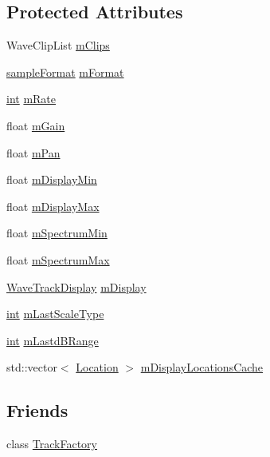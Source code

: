 \subsection*{Protected Attributes}
\begin{DoxyCompactItemize}
\item 
Wave\+Clip\+List \hyperlink{class_wave_track_aab186786a53179d53c986771c42f5880}{m\+Clips}
\item 
\hyperlink{include_2audacity_2_types_8h_a9938d2e2f6adef23e745cd80ef379792}{sample\+Format} \hyperlink{class_wave_track_a3938299d11824a2314ce22c688468e26}{m\+Format}
\item 
\hyperlink{xmltok_8h_a5a0d4a5641ce434f1d23533f2b2e6653}{int} \hyperlink{class_wave_track_ac9ff43cf5ca331f25aa7796beaa7c016}{m\+Rate}
\item 
float \hyperlink{class_wave_track_a07150ae1d89338c529717a3a43163bbc}{m\+Gain}
\item 
float \hyperlink{class_wave_track_a342936b12f0ed288970c87eaed874b71}{m\+Pan}
\item 
float \hyperlink{class_wave_track_a144805b8b5d766763d93cf1c47bb0cc0}{m\+Display\+Min}
\item 
float \hyperlink{class_wave_track_a8dbec05f10d02f2c2547d846ca8cfc21}{m\+Display\+Max}
\item 
float \hyperlink{class_wave_track_a69645755c41a02f3c20f80f0bf5ced79}{m\+Spectrum\+Min}
\item 
float \hyperlink{class_wave_track_a92d5b6594bbe1a2b7dba5121c52882c6}{m\+Spectrum\+Max}
\item 
\hyperlink{class_wave_track_a084eba52413a5cc74d2634b36e2f85b5}{Wave\+Track\+Display} \hyperlink{class_wave_track_a8c6f228f31fb7b7c144ca775d4600c10}{m\+Display}
\item 
\hyperlink{xmltok_8h_a5a0d4a5641ce434f1d23533f2b2e6653}{int} \hyperlink{class_wave_track_a6bfa61bbb71254a2b5aa643626be09c5}{m\+Last\+Scale\+Type}
\item 
\hyperlink{xmltok_8h_a5a0d4a5641ce434f1d23533f2b2e6653}{int} \hyperlink{class_wave_track_a8ee50fdd7a4411462b2768151fb0a72f}{m\+Lastd\+B\+Range}
\item 
std\+::vector$<$ \hyperlink{class_wave_track_1_1_location}{Location} $>$ \hyperlink{class_wave_track_a83d2ef555e3b4d6c0a3dab21fa83c2b0}{m\+Display\+Locations\+Cache}
\end{DoxyCompactItemize}
\subsection*{Friends}
\begin{DoxyCompactItemize}
\item 
class \hyperlink{class_wave_track_a9090c4844308a62885cce4b693b74666}{Track\+Factory}
\end{DoxyCompactItemize}
